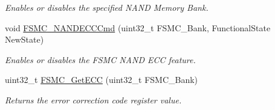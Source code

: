 \begin{DoxyCompactItemize}
\begin{DoxyCompactList}\small\item\em Enables or disables the specified N\-A\-N\-D Memory Bank. \end{DoxyCompactList}\item 
void \hyperlink{group___f_s_m_c___group2_ga5800301fc39bbe998a18ebd9ff191cdc}{F\-S\-M\-C\-\_\-\-N\-A\-N\-D\-E\-C\-C\-Cmd} (uint32\-\_\-t F\-S\-M\-C\-\_\-\-Bank, Functional\-State New\-State)
\begin{DoxyCompactList}\small\item\em Enables or disables the F\-S\-M\-C N\-A\-N\-D E\-C\-C feature. \end{DoxyCompactList}\item 
uint32\-\_\-t \hyperlink{group___f_s_m_c___group2_gaad6d4f5b5a41684ce053fea55bdb98d8}{F\-S\-M\-C\-\_\-\-Get\-E\-C\-C} (uint32\-\_\-t F\-S\-M\-C\-\_\-\-Bank)
\begin{DoxyCompactList}\small\item\em Returns the error correction code register value. \end{DoxyCompactList}\end{DoxyCompactItemize}


